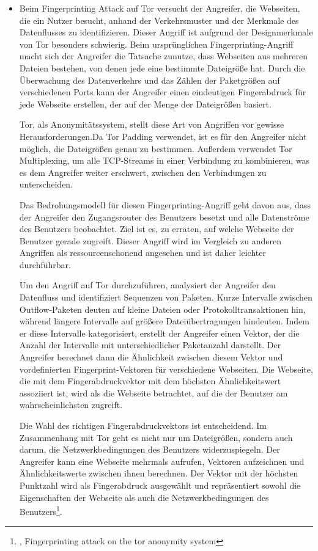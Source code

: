 \begin{itemize}
    \item Beim Fingerprinting Attack auf Tor versucht der Angreifer, die Webseiten, die ein Nutzer besucht, anhand der Verkehrsmuster und der Merkmale des Datenflusses zu identifizieren. Dieser Angriff ist aufgrund der Designmerkmale von Tor besonders schwierig. Beim ursprünglichen Fingerprinting-Angriff macht sich der Angreifer die Tatsache zunutze, dass Webseiten aus mehreren Dateien bestehen, von denen jede eine bestimmte Dateigröße hat. Durch die Überwachung des Datenverkehrs und das Zählen der Paketgrößen auf verschiedenen Ports kann der Angreifer einen eindeutigen Fingerabdruck für jede Webseite erstellen, der auf der Menge der Dateigrößen basiert.

    Tor, als Anonymitätssystem, stellt diese Art von Angriffen vor gewisse Herausforderungen.Da Tor Padding verwendet, ist es für den Angreifer nicht möglich, die Dateigrößen genau zu bestimmen. Außerdem verwendet Tor Multiplexing, um alle TCP-Streams in einer Verbindung zu kombinieren, was es dem Angreifer weiter erschwert, zwischen den Verbindungen zu unterscheiden.

    Das Bedrohungsmodell für diesen Fingerprinting-Angriff geht davon aus, dass der Angreifer den Zugangsrouter des Benutzers besetzt und alle Datenströme des Benutzers beobachtet. Ziel ist es, zu erraten, auf welche Webseite der Benutzer gerade zugreift. Dieser Angriff wird im Vergleich zu anderen Angriffen als ressourcenschonend angesehen und ist daher leichter durchführbar.

    Um den Angriff auf Tor durchzuführen, analysiert der Angreifer den Datenfluss und identifiziert Sequenzen von Paketen. Kurze Intervalle zwischen Outflow-Paketen deuten auf kleine Dateien oder Protokolltransaktionen hin, während längere Intervalle auf größere Dateiübertragungen hindeuten. Indem er diese Intervalle kategorisiert, erstellt der Angreifer einen Vektor, der die Anzahl der Intervalle mit unterschiedlicher Paketanzahl darstellt. Der Angreifer berechnet dann die Ähnlichkeit zwischen diesem Vektor und vordefinierten Fingerprint-Vektoren für verschiedene Webseiten. Die Webseite, die mit dem Fingerabdruckvektor mit dem höchsten Ähnlichkeitswert assoziiert ist, wird als die Webseite betrachtet, auf die der Benutzer am wahrscheinlichsten zugreift.

    Die Wahl des richtigen Fingerabdruckvektors ist entscheidend. Im Zusammenhang mit Tor geht es nicht nur um Dateigrößen, sondern auch darum, die Netzwerkbedingungen des Benutzers widerzuspiegeln. Der Angreifer kann eine Webseite mehrmals aufrufen, Vektoren aufzeichnen und Ähnlichkeitswerte zwischen ihnen berechnen. Der Vektor mit der höchsten Punktzahl wird als Fingerabdruck ausgewählt und repräsentiert sowohl die Eigenschaften der Webseite als auch die Netzwerkbedingungen des Benutzers\footnote{\cite{FingerprintingOnTorAttack}, Fingerprinting attack on the tor anonymity system}.


\end{itemize}
